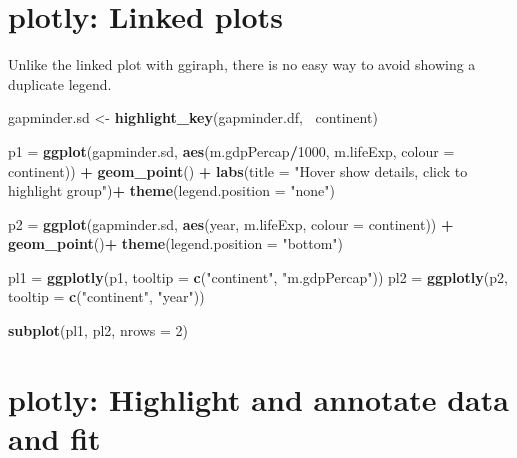 \documentclass[]{krantz}
\makeatletter
\newenvironment{Shaded}{\begin{snugshade}}{\end{snugshade}}
\newcommand{\DataTypeTok}[1]{\textcolor[rgb]{0.13,0.29,0.53}{#1}}
\newcommand{\DecValTok}[1]{\textcolor[rgb]{0.00,0.00,0.81}{#1}}
\newcommand{\KeywordTok}[1]{\textcolor[rgb]{0.13,0.29,0.53}{\textbf{#1}}}
\newcommand{\NormalTok}[1]{#1}
\newcommand{\OperatorTok}[1]{\textcolor[rgb]{0.81,0.36,0.00}{\textbf{#1}}}
\newcommand{\StringTok}[1]{\textcolor[rgb]{0.31,0.60,0.02}{#1}}
\newenvironment{kframe}{%
\medskip{}
\setlength{\fboxsep}{.8em}
 \def\at@end@of@kframe{}%
 \ifinner\ifhmode%
  \def\at@end@of@kframe{\end{minipage}}%
  \begin{minipage}{\columnwidth}%
 \fi\fi%
 \def\FrameCommand##1{\hskip\@totalleftmargin \hskip-\fboxsep
 \colorbox{shadecolor}{##1}\hskip-\fboxsep
     \hskip-\linewidth \hskip-\@totalleftmargin \hskip\columnwidth}%
 \MakeFramed {\advance\hsize-\width
   \@totalleftmargin\z@ \linewidth\hsize
   \@setminipage}}%
 {\par\unskip\endMakeFramed%
 \at@end@of@kframe}
\renewenvironment{Shaded}{\begin{kframe}}{\end{kframe}}
\makeatother
\begin{document}
\hypertarget{htmlwidget-8254349c959344eeaf9a}{}

\hypertarget{plotly-linked-plots}{%
\section{plotly: Linked plots}\label{plotly-linked-plots}}

Unlike the linked plot with ggiraph, there is no easy way to avoid showing a duplicate legend.

\begin{Shaded}
\begin{Highlighting}[]
\NormalTok{gapminder.sd <-}\StringTok{ }\KeywordTok{highlight_key}\NormalTok{(gapminder.df, }\OperatorTok{~}\NormalTok{continent)}

\NormalTok{p1 =}\StringTok{ }
\KeywordTok{ggplot}\NormalTok{(gapminder.sd, }\KeywordTok{aes}\NormalTok{(m.gdpPercap}\OperatorTok{/}\DecValTok{1000}\NormalTok{, m.lifeExp, }\DataTypeTok{colour =}\NormalTok{ continent)) }\OperatorTok{+}
\StringTok{  }\KeywordTok{geom_point}\NormalTok{() }\OperatorTok{+}
\StringTok{  }\KeywordTok{labs}\NormalTok{(}\DataTypeTok{title =} \StringTok{"Hover show details, click to highlight group"}\NormalTok{)}\OperatorTok{+}
\StringTok{  }\KeywordTok{theme}\NormalTok{(}\DataTypeTok{legend.position =} \StringTok{"none"}\NormalTok{)}

\NormalTok{p2 =}\StringTok{ }
\KeywordTok{ggplot}\NormalTok{(gapminder.sd, }\KeywordTok{aes}\NormalTok{(year, m.lifeExp, }\DataTypeTok{colour =}\NormalTok{ continent)) }\OperatorTok{+}
\StringTok{  }\KeywordTok{geom_point}\NormalTok{()}\OperatorTok{+}
\StringTok{  }\KeywordTok{theme}\NormalTok{(}\DataTypeTok{legend.position =} \StringTok{"bottom"}\NormalTok{)}

\NormalTok{pl1 =}\StringTok{ }\KeywordTok{ggplotly}\NormalTok{(p1, }\DataTypeTok{tooltip =} \KeywordTok{c}\NormalTok{(}\StringTok{"continent"}\NormalTok{, }\StringTok{"m.gdpPercap"}\NormalTok{))}
\NormalTok{pl2 =}\StringTok{ }\KeywordTok{ggplotly}\NormalTok{(p2, }\DataTypeTok{tooltip =} \KeywordTok{c}\NormalTok{(}\StringTok{"continent"}\NormalTok{, }\StringTok{"year"}\NormalTok{))}

\KeywordTok{subplot}\NormalTok{(pl1, pl2, }\DataTypeTok{nrows =} \DecValTok{2}\NormalTok{)}
\end{Highlighting}
\end{Shaded}

\hypertarget{htmlwidget-e86f4e09ae48de7a7956}{}

\hypertarget{plotly-highlight-and-annotate-data-and-fit}{%
\section{plotly: Highlight and annotate data and fit}\label{plotly-highlight-and-annotate-data-and-fit}}
\end{document}
